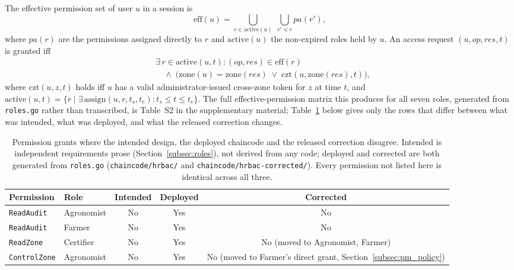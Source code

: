 \documentclass[a4paper,fleqn]{cas-sc}
\begin{document}
The effective permission set of user $u$ in a session is
\begin{equation}
\mathrm{eff}(u) = \bigcup_{r \in \mathrm{active}(u)}
  \; \bigcup_{r' \preceq r} pa(r'),
\end{equation}
where $pa(r)$ are the permissions assigned directly to $r$ and
$\mathrm{active}(u)$ the non-expired roles held by $u$. An access request
$(u, \mathit{op}, \mathit{res}, t)$ is granted iff
\begin{equation}
\begin{aligned}
&\exists\, r \in \mathrm{active}(u,t):
  (\mathit{op},\mathit{res}) \in \mathrm{eff}(r)\\
&\quad \land\;
  \bigl(\mathrm{zone}(u) = \mathrm{zone}(\mathit{res})
  \;\lor\; \mathrm{czt}(u, \mathrm{zone}(\mathit{res}), t)\bigr),
\end{aligned}
\label{eq:grant}
\end{equation}
where $\mathrm{czt}(u,z,t)$ holds iff $u$ has a valid administrator-issued
cross-zone token for $z$ at time $t$, and
$\mathrm{active}(u,t) = \{r \mid \exists\,\mathrm{assign}(u,r,t_s,t_e):
t_s \le t \le t_e\}$. The full effective-permission matrix this produces for
all seven roles, generated from \texttt{roles.go} rather than transcribed,
is Table~S2 in the supplementary material; Table~\ref{tab:permdiff} below
gives only the rows that differ between what was intended, what was
deployed, and what the released correction changes.

\begin{table}[pos=t]
\caption{Permission grants where the intended design, the deployed
  chaincode and the released correction disagree. Intended is independent
  requirements prose (Section~\ref{subsec:roles}), not derived from any
  code; deployed and corrected are both generated from \texttt{roles.go}
  (\texttt{chaincode/hrbac/} and \texttt{chaincode/hrbac-corrected/}).
  Every
  permission not listed here is identical across all three.}
\label{tab:permdiff}
\small
\begin{tabularx}{\columnwidth}{@{}lXccc@{}}
\toprule
Permission & Role & Intended & Deployed & Corrected \\
\midrule
\texttt{ReadAudit}   & Agronomist & No & Yes & No \\
\texttt{ReadAudit}   & Farmer     & No & Yes & No \\
\texttt{ReadZone}    & Certifier  & No & Yes & No (moved to Agronomist, Farmer) \\
\texttt{ControlZone} & Agronomist & No & Yes & No (moved to Farmer's direct
  grant, Section~\ref{subsec:pm_policy}) \\
\bottomrule
\end{tabularx}
\end{table}
\end{document}
